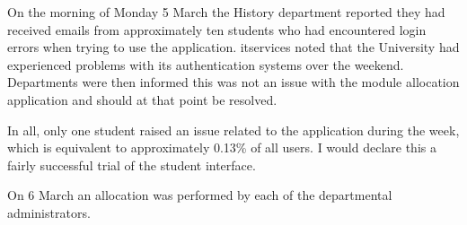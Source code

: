 On the morning of Monday 5 March the History department reported they had
received emails from approximately ten students who had encountered login
errors when trying to use the application. \gls{itservices} noted that the
University had experienced problems with its authentication systems over the
weekend. Departments were then informed this was not an issue with the module
allocation application and should at that point be resolved.

In all, only one student raised an issue related to the application during the
week, which is equivalent to approximately 0.13\% of all users. I would
declare this a fairly successful trial of the student interface.

On 6 March an allocation was performed by each of the departmental %
administrators.


